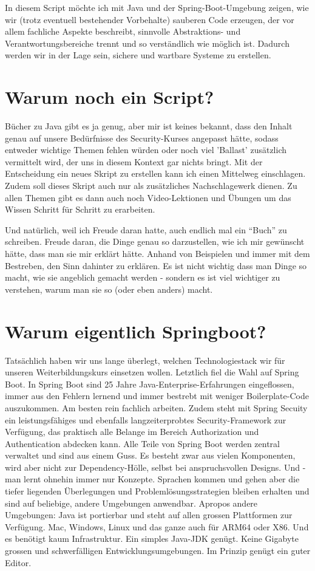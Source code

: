 In diesem Script möchte ich mit Java und der Spring-Boot-Umgebung zeigen, wie wir
(trotz eventuell bestehender Vorbehalte) sauberen Code erzeugen, der vor allem 
fachliche Aspekte beschreibt, sinnvolle
Abstraktions- und Verantwortungsbereiche trennt und so verständlich wie möglich
ist. Dadurch werden wir in der Lage sein, sichere und wartbare Systeme zu 
erstellen.

\section{Warum noch ein Script?}
Bücher zu Java gibt es ja genug, aber mir ist keines bekannt, dass den Inhalt
genau auf unsere Bedürfnisse des Security-Kurses angepasst hätte, sodass
entweder wichtige Themen fehlen würden oder noch viel 'Ballast' zusätzlich
vermittelt wird, der uns in diesem Kontext gar nichts bringt. Mit der 
Entscheidung ein neues Skript zu erstellen kann ich einen Mittelweg einschlagen.
Zudem soll dieses Skript auch nur als zusätzliches Nachschlagewerk dienen. Zu
allen Themen gibt es dann auch noch Video-Lektionen und Übungen um das Wissen 
Schritt für Schritt zu erarbeiten.

Und natürlich, weil ich Freude daran hatte, auch endlich mal ein ``Buch'' zu 
schreiben.
Freude daran, die Dinge genau so darzustellen, wie ich mir gewünscht hätte, dass
man sie mir erklärt hätte. Anhand von Beispielen und immer mit dem Bestreben,
den Sinn dahinter zu erklären. Es ist nicht wichtig dass man Dinge so macht, 
wie sie angeblich gemacht werden - sondern es ist viel wichtiger zu verstehen, 
warum man sie so (oder eben anders) macht.

\section{Warum eigentlich Springboot?}
Tatsächlich haben wir uns lange überlegt, welchen Technologiestack wir
für unseren Weiterbildungskurs einsetzen wollen. Letztlich fiel die Wahl
auf Spring Boot. In Spring Boot sind 25 Jahre Java-Enterprise-Erfahrungen
eingeflossen, immer aus den Fehlern lernend und immer bestrebt mit weniger
Boilerplate-Code auszukommen. Am besten rein fachlich arbeiten. Zudem steht mit
Spring Secuity ein leistungsfähiges und ebenfalls langzeiterprobtes 
Security-Framework zur Verfügung, das praktisch alle Belange im Bereich
Authorization und Authentication abdecken kann. Alle Teile von Spring Boot 
werden zentral verwaltet und sind aus einem Guss. Es besteht zwar aus vielen
Komponenten, wird aber nicht zur Dependency-Hölle, selbst bei anspruchsvollen
Designs. Und - man lernt ohnehin immer nur Konzepte. Sprachen kommen und gehen
aber die tiefer liegenden Überlegungen und Problemlösungsstrategien bleiben
erhalten und sind auf beliebige, andere Umgebungen anwendbar. Apropos andere
Umgebungen: Java ist portierbar und steht auf allen grossen Plattformen zur
Verfügung. Mac, Windows, Linux und das ganze auch für ARM64 oder X86. Und es 
benötigt kaum Infrastruktur. Ein simples Java-JDK genügt. Keine Gigabyte 
grossen und schwerfälligen Entwicklungsumgebungen. Im Prinzip genügt ein 
guter Editor.

